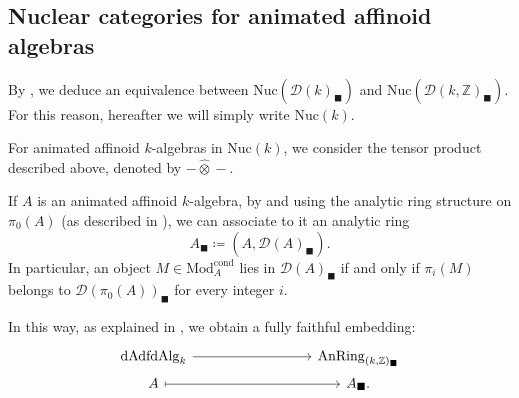 \documentclass[oneside, hidelinks, 12pt, a4paper,reqno]{amsart}
\theoremstyle{plain}
\theoremstyle{definition}
\theoremstyle{plain}
\newtheorem{proposition}[proposition]{Proposition}
\newcommand{\Z}{\mathbb Z}
\newcommand{\cD}{\mathscr D}
\newcommand{\cat}{$\infty$-category }
\newcommand{\Nuc}{\mathrm{Nuc}}
\newcommand{\Mod}{\mathrm{Mod}}
\newcommand{\Solid}{\blacksquare}
\begin{document}

\subsection{Nuclear categories for animated affinoid algebras}

By \cite[Kollar 3.18]{andreychev2023ktheorieadischerraume}, we deduce an equivalence between $\Nuc(\cD(k)_\Solid)$ and $\Nuc(\cD(k,\Z)_\Solid)$. For this reason, hereafter we will simply write $\Nuc(k)$.

For animated affinoid $k$-algebras in $\Nuc(k)$, we consider the tensor product described above, denoted by $-\widehat{\otimes}-$.

If $A$ is an animated affinoid $k$-algebra, by \cite[Proposition 12.21]{analytic} and using the analytic ring structure on $\pi_{0}(A)$ (as described in \cite[Theorem 3.28]{andreychev2021pseudocoherent}), we can associate to it an analytic ring
\begin{equation*}\label{eq: analytic ring structure on derived affinoid}
    A_{\Solid} \coloneqq (A, \cD(A)_{\Solid}).
\end{equation*} 
In particular, an object $M \in \Mod_{A}^{\mathrm{cond}}$ lies in $\cD(A)_\Solid$ if and only if $\pi_{i}(M)$ belongs to $\cD(\pi_{0}(A))_{\Solid}$ for every integer $i$. 

In this way, as explained in \cite[Proposition 2.18]{mikami2023fppfdescentcondensedanimatedrings}, we obtain a fully faithful embedding:
\[\begin{tikzcd}[row sep=0.05cm, column sep=1.5cm]
	{\mathrm{dAdfdAlg}_k} && {\mathrm{AnRing}_{(k,\Z)_\Solid}} \\
	A && {A_\Solid}.
	\arrow[from=1-1, to=1-3]
	\arrow[maps to, from=2-1, to=2-3]
\end{tikzcd}\]
\end{document}
